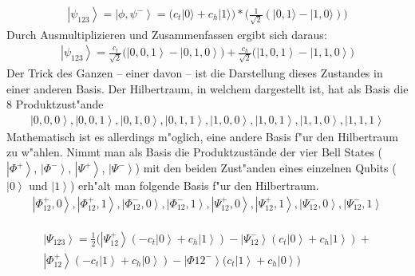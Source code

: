 \begin{refsection}
\begin{align}
\left|\psi_{123}\right\rangle = \left| \phi, \psi^{-} \right\rangle = \big( c_{t} | 0 \rangle + c_{h} | 1 \rangle \big) * \big( \frac{1}{\sqrt{2}} \left(|0, 1 \rangle - |1, 0 \rangle \right) \big)
\end{align}
Durch Ausmultiplizieren und Zusammenfassen ergibt sich daraus:
\begin{align}
\left|\psi_{123}\right\rangle = \frac{c_t}{\sqrt{2}} \big(\left|0, 0, 1 \right\rangle - \left|0, 1, 0 \right\rangle  \big) + \frac{c_h}{\sqrt{2}} \big(\left|1, 0, 1 \right\rangle - \left|1, 1, 0 \right\rangle \big)
\end{align}
Der Trick des Ganzen – einer davon – ist die Darstellung dieses Zustandes in einer anderen Basis. Der Hilbertraum, in welchem %
dargestellt ist, hat als Basis die 8 Produktzust"ande
\begin{align}
\left|  0,0,0 \right \rangle,\left|  0,0,1 \right \rangle,\left|  0,1,0 \right \rangle,\left|  0,1,1 \right \rangle,\left|  1,0,0 \right \rangle,\left|  1,0,1 \right \rangle,\left|  1,1,0 \right \rangle,\left|  1,1,1 \right \rangle
\end{align}
Mathematisch ist es allerdings m"oglich, eine andere Basis f"ur den Hilbertraum zu w"ahlen. Nimmt man als Basis die Produktzustände der vier Bell States ($\left|\Phi^+\right\rangle$, $\left|\Phi^-\right\rangle$, $\left|\Psi^+\right\rangle$, $\left|\Psi^-\right\rangle$) mit den beiden Zust"anden eines einzelnen Qubits ($\left|0\right\rangle$ und $\left|1\right\rangle$) erh"alt man folgende Basis f"ur den Hilbertraum.
\begin{align}
\left|\Phi^{+}_{12},0\right\rangle,
\left|\Phi^{+}_{12},1\right\rangle, 
\left|\Phi^{-}_{12},0\right\rangle,
\left|\Phi^{-}_{12},1\right\rangle,
\left|\Psi^{+}_{12},0\right\rangle,
\left|\Psi^{+}_{12},1\right\rangle,
\left|\Psi^{-}_{12},0\right\rangle,
\left|\Psi^{-}_{12},1\right\rangle
\end{align}

\begin{align}
	\begin{split}
\left| \Psi_{123} \right\rangle = \frac{1}{2} \Bigg( \left| \Psi_{12}^{+} \right\rangle (-c_{t} \left| 0 \right\rangle + c_{h} \left| 1 \right\rangle) - \left| \Psi_{12}^{-} \right\rangle (c_{t} \left| 0 \right\rangle + c_{h} \left| 1 \right\rangle ) +
\\
 \left| \Phi_{12}^{+} \right\rangle (-c_{t} \left| 1 \right\rangle + c_{h} \left| 0 \right\rangle) - \left| \Phi{12}^{-} \right\rangle (c_{t} \left| 1 \right\rangle + c_{h} \left| 0 \right\rangle
 \Bigg)
 \end{split}
\end{align}


\end{refsection}
